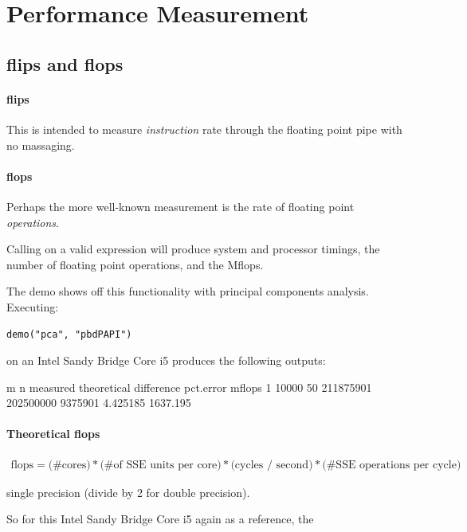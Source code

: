 \section{Performance Measurement}


\subsection{flips and flops}

\paragraph{flips}  This is intended to measure \emph{instruction} rate through 
the floating point pipe with no massaging.



\paragraph{flops}  Perhaps the more well-known measurement is the rate of  
floating point \emph{operations}.  

Calling  on a valid \R expression  will  
produce system and processor timings, the number of floating point operations, 
and the Mflops.

The  demo shows off this functionality with principal components  
analysis.  Executing:
\begin{lstlisting}
demo("pca", "pbdPAPI")
\end{lstlisting}
on an Intel Sandy Bridge Core i5 produces the following outputs:
\begin{Output}
      m  n  measured theoretical difference pct.error   mflops
1 10000 50 211875901   202500000    9375901  4.425185 1637.195
\end{Output}



\paragraph{Theoretical flops}
\begin{align*}
\text{flops} = \text{(\# cores)} * \text{(\# of SSE units per core)} *  
\text{(cycles / second)} * \text{(\# SSE operations per cycle)}
\end{align*}

single precision (divide by 2 for double precision).

So for this Intel Sandy Bridge Core i5 again as a reference, the 

